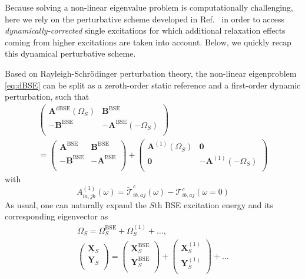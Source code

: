 \documentclass[aip,jcp,reprint,noshowkeys,superscriptaddress]{revtex4-1}
\newcommand{\BSE}{\text{BSE}}
\newcommand{\dBSE}{\text{dBSE}}
\newcommand{\Om}[2]{\Omega_{#1}^{#2}}
\newcommand{\bO}{\mathbf{0}}
\newcommand{\bA}[2]{\mathbf{A}_{#1}^{#2}}
\newcommand{\bB}[2]{\mathbf{B}_{#1}^{#2}}
\newcommand{\bX}[2]{\mathbf{X}_{#1}^{#2}}
\newcommand{\bY}[2]{\mathbf{Y}_{#1}^{#2}}
\newcommand{\cT}{\mathcal{T}}
\begin{document}
Because solving a non-linear eigenvalue problem is computationally challenging, here we rely on the perturbative scheme developed in Ref.~ in order to access \textit{dynamically-corrected} single excitations for which additional relaxation effects coming from higher excitations are taken into account.
\cite{Rohlfing_2000,Romaniello_2009b,Ma_2009a,Ma_2009b,Zhang_2013,Rebolini_2016,Olevano_2019,Loos_2020h,Authier_2020,Monino_2021}
Below, we quickly recap this dynamical perturbative scheme.

Based on Rayleigh-Schr\"odinger perturbation theory, the non-linear eigenproblem \eqref{eq:dBSE} can be split as a zeroth-order static reference and a first-order dynamic perturbation, such that
\begin{multline}
\label{eq:LR-PT}
	\begin{pmatrix}
		\bA{}{\dBSE}(\Om{S}{})		&	\bB{}{\BSE}	\\
		-\bB{}{\BSE}	&	-\bA{}{\BSE}(-\Om{S}{})	\\
	\end{pmatrix}
	\\
	=
	\begin{pmatrix}
		\bA{}{\BSE}	&	\bB{}{\BSE}	
		\\
		-\bB{}{\BSE}	&	-\bA{}{\BSE}	
		\\
	\end{pmatrix}
	+
	\begin{pmatrix}
		\bA{}{(1)}(\Om{S}{})		&	\bO	\\
		\bO	&	-\bA{}{(1)}(-\Om{S}{})	\\
	\end{pmatrix}
\end{multline}
with
\begin{equation}
	\label{eq:BSE-A1}
	A_{ia,jb}^{(1)}(\omega) = \widetilde{\cT}^c_{ib,aj}(\omega) - \cT^c_{ib,aj}(\omega = 0)
\end{equation}
As usual, one can naturally expand the $S$th BSE excitation energy and its corresponding eigenvector as
\begin{subequations}
\begin{gather}
	\Om{S}{} = \Om{S}{\BSE} + \Om{S}{(1)} + \ldots,
	\\
	\begin{pmatrix}
		\bX{S}{}	\\
		\bY{S}{}	\\
	\end{pmatrix}
	= 
	\begin{pmatrix}
		\bX{S}{\BSE}	\\
		\bY{S}{\BSE}	\\
	\end{pmatrix}
	+
	\begin{pmatrix}
		\bX{S}{(1)}	\\
		\bY{S}{(1)}	\\
	\end{pmatrix}
	+ \ldots
\end{gather}
\end{subequations}
\end{document}
